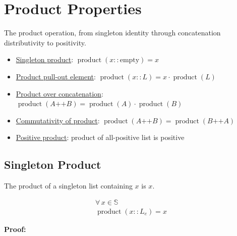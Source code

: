 \section{Product Properties}
\label{sec:product}

The product operation, from singleton identity through concatenation
distributivity to positivity.

\begin{itemize}
  \item \href{https://github.com/thiagomata/prime-numbers/blob/list-article-v1.0.0/src/main/scala/v1/chapter3/list/properties/ListProduct.scala}{Singleton product}:
    $\operatorname{product}(x :: \text{empty}) = x$
  \item \href{https://github.com/thiagomata/prime-numbers/blob/list-article-v1.0.0/src/main/scala/v1/chapter3/list/properties/ListProduct.scala}{Product pull-out element}:
    $\operatorname{product}(x :: L) = x \cdot \operatorname{product}(L)$
  \item \href{https://github.com/thiagomata/prime-numbers/blob/list-article-v1.0.0/src/main/scala/v1/chapter3/list/properties/ListProduct.scala}{Product over concatenation}:
    $\operatorname{product}(A \mathbin{\texttt{++}} B) = \operatorname{product}(A) \cdot \operatorname{product}(B)$
  \item \href{https://github.com/thiagomata/prime-numbers/blob/list-article-v1.0.0/src/main/scala/v1/chapter3/list/properties/ListProduct.scala}{Commutativity of product}:
    $\operatorname{product}(A \mathbin{\texttt{++}} B) = \operatorname{product}(B \mathbin{\texttt{++}} A)$
  \item \href{https://github.com/thiagomata/prime-numbers/blob/list-article-v1.0.0/src/main/scala/v1/chapter3/list/properties/ListProduct.scala}{Positive product}:
    product of all-positive list is positive
\end{itemize}

\subsection{Singleton Product}

The product of a singleton list containing $x$ is $x$.

\begin{gather*}
\forall\, x \in \mathbb{S} \\
\operatorname{product}(x :: L_e) = x
\end{gather*}

\textbf{Proof:}

